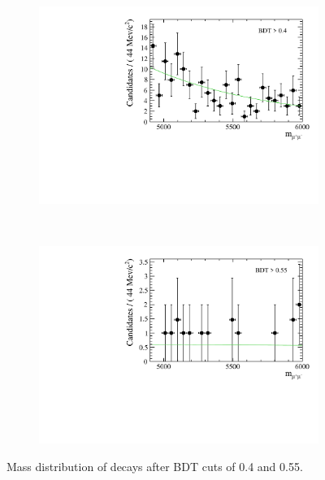 \begin{figure}
    \centering
    \begin{subfigure}[b]{0.4\textwidth}
        \includegraphics[width=\textwidth]{./Figs/Selection/BDT0p4.pdf}
        \caption{ }
        \label{fig:BDT0p4}
    \end{subfigure}
    ~ %
    \begin{subfigure}[b]{0.4\textwidth}
       \includegraphics[width=\textwidth]{./Figs/Selection/BDT0p55.pdf}
        \caption{ }
        \label{fig:BDT0p5}
    \end{subfigure}
    \caption{Mass distribution of \bbarmumux decays after BDT cuts of 0.4 and 0.55.}
    \label{fig:BDTmasses}
\end{figure}


